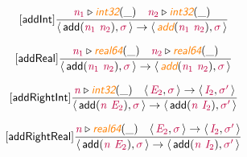 \documentclass[10pt,leqno,fleqn]{article}
\newcommand{\artVariable}[1]{\mbox{\color{purple}\em #1\/}}
\newcommand{\artConstructor}[1]{\mbox{\sf #1}}
\newcommand{\artSpecial}[1]{\mbox{\color{orange}\sf\em #1}}
\begin{document}
\begin{equation}
\tag*{[\artConstructor{\sf addInt}]}
\begin{split}\frac{ \artVariable{n$_{1}$}\triangleright \artSpecial{int32}(\_) \quad  \artVariable{n$_{2}$}\triangleright \artSpecial{int32}(\_) }{\langle\, \artConstructor{\sf add}(\artVariable{n$_{1}$}\ \artVariable{n$_{2}$}), \artVariable{$\sigma$}\,\rangle \rightarrow \langle\, \artSpecial{add}(\artVariable{n$_{1}$}\ \artVariable{n$_{2}$}), \artVariable{$\sigma$}\,\rangle }
\end{split}
\end{equation}

\begin{equation}
\tag*{[\artConstructor{\sf addReal}]}
\begin{split}\frac{ \artVariable{n$_{1}$}\triangleright \artSpecial{real64}(\_) \quad  \artVariable{n$_{2}$}\triangleright \artSpecial{real64}(\_) }{\langle\, \artConstructor{\sf add}(\artVariable{n$_{1}$}\ \artVariable{n$_{2}$}), \artVariable{$\sigma$}\,\rangle \rightarrow \langle\, \artSpecial{add}(\artVariable{n$_{1}$}\ \artVariable{n$_{2}$}), \artVariable{$\sigma$}\,\rangle }
\end{split}
\end{equation}

\begin{equation}
\tag*{[\artConstructor{\sf addRightInt}]}
\begin{split}\frac{ \artVariable{n}\triangleright \artSpecial{int32}(\_) \quad \langle\, \artVariable{E$_{2}$}, \artVariable{$\sigma$}\,\rangle \rightarrow \langle\, \artVariable{I$_{2}$}, \artVariable{$\sigma$\/$^\prime$}\,\rangle }{\langle\, \artConstructor{\sf add}(\artVariable{n}\ \artVariable{E$_{2}$}), \artVariable{$\sigma$}\,\rangle \rightarrow \langle\, \artConstructor{\sf add}(\artVariable{n}\ \artVariable{I$_{2}$}), \artVariable{$\sigma$\/$^\prime$}\,\rangle }
\end{split}
\end{equation}

\begin{equation}
\tag*{[\artConstructor{\sf addRightReal}]}
\begin{split}\frac{ \artVariable{n}\triangleright \artSpecial{real64}(\_) \quad \langle\, \artVariable{E$_{2}$}, \artVariable{$\sigma$}\,\rangle \rightarrow \langle\, \artVariable{I$_{2}$}, \artVariable{$\sigma$\/$^\prime$}\,\rangle }{\langle\, \artConstructor{\sf add}(\artVariable{n}\ \artVariable{E$_{2}$}), \artVariable{$\sigma$}\,\rangle \rightarrow \langle\, \artConstructor{\sf add}(\artVariable{n}\ \artVariable{I$_{2}$}), \artVariable{$\sigma$\/$^\prime$}\,\rangle }
\end{split}
\end{equation}
\end{document}
